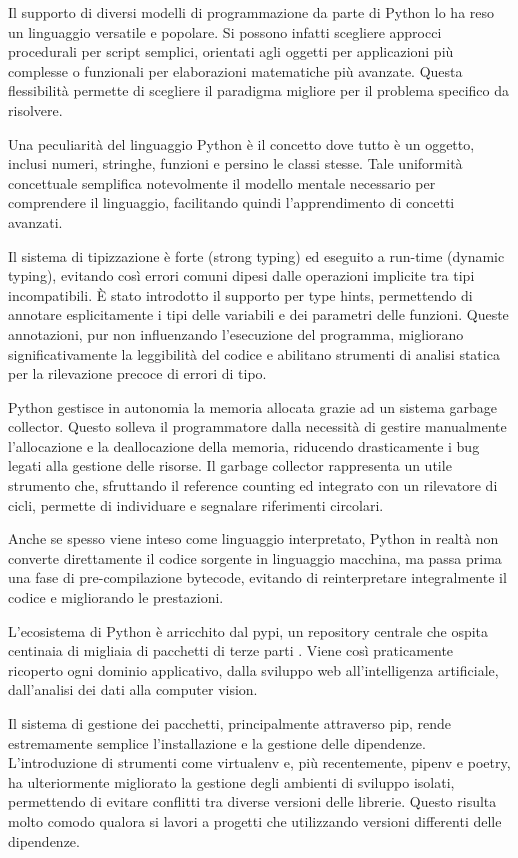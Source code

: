 Il supporto di diversi modelli di programmazione da parte di Python lo ha reso un linguaggio versatile e popolare.
Si possono infatti scegliere approcci procedurali per script semplici, orientati agli oggetti per applicazioni più
complesse o funzionali per elaborazioni matematiche più avanzate. Questa flessibilità permette di scegliere il paradigma
migliore per il problema specifico da risolvere.

Una peculiarità del linguaggio Python è il concetto dove tutto è un oggetto, inclusi numeri, stringhe,
funzioni e persino le classi stesse. Tale uniformità concettuale semplifica notevolmente il modello mentale necessario
per comprendere il linguaggio, facilitando quindi l'apprendimento di concetti avanzati.

Il sistema di tipizzazione è forte (strong typing) ed eseguito a run-time (dynamic typing), evitando così errori comuni
dipesi dalle operazioni implicite tra tipi incompatibili. È stato introdotto il supporto per type hints, permettendo
di annotare esplicitamente i tipi delle variabili e dei parametri delle funzioni. Queste annotazioni, pur non
influenzando l'esecuzione del programma, migliorano significativamente la leggibilità del codice e abilitano strumenti
di analisi statica per la rilevazione precoce di errori di tipo.

Python gestisce in autonomia la memoria allocata grazie ad un sistema garbage collector.
Questo solleva il programmatore dalla necessità di gestire manualmente l'allocazione e la deallocazione della memoria,
riducendo drasticamente i bug legati alla gestione delle risorse. Il garbage collector rappresenta un utile strumento
che, sfruttando il reference counting ed integrato con un rilevatore di cicli, permette di individuare e segnalare
riferimenti circolari.

Anche se spesso viene inteso come linguaggio interpretato, Python in realtà non converte direttamente
il codice sorgente in linguaggio macchina, ma passa prima una fase di pre-compilazione bytecode, evitando di
reinterpretare integralmente il codice e migliorando le prestazioni.

L'ecosistema di Python è arricchito dal \acrfull{pypi}, un repository centrale che ospita centinaia di migliaia di
pacchetti di terze parti \citep{pypi_2023}. Viene così  praticamente ricoperto ogni dominio applicativo,
dalla sviluppo web all'intelligenza artificiale, dall'analisi dei dati alla computer vision.

Il sistema di gestione dei pacchetti, principalmente attraverso pip, rende estremamente semplice l'installazione e la
gestione delle dipendenze. L'introduzione di strumenti come virtualenv e, più recentemente, pipenv e poetry,
ha ulteriormente migliorato la gestione degli ambienti di sviluppo isolati, permettendo di evitare conflitti
tra diverse versioni delle librerie. Questo risulta molto comodo qualora si lavori a progetti che utilizzando versioni
differenti delle dipendenze.

